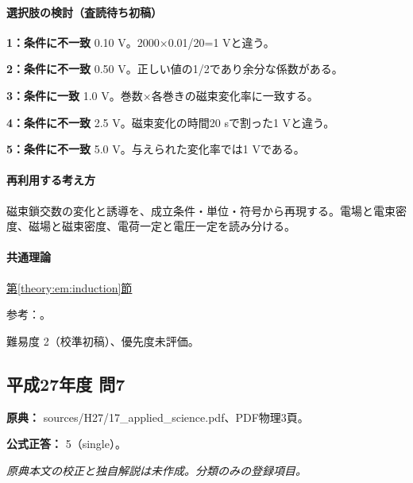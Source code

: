 \paragraph{選択肢の検討（査読待ち初稿）}\mbox{}\par

\noindent\textbf{1：条件に不一致} 0.10 V。2000×0.01/20=\allowbreak{}1 Vと違う。\par

\noindent\textbf{2：条件に不一致} 0.50 V。正しい値の1/2であり余分な係数がある。\par

\noindent\textbf{3：条件に一致} 1.0 V。巻数×各巻きの磁束変化率に一致する。\par

\noindent\textbf{4：条件に不一致} 2.5 V。磁束変化の時間20 sで割った1 Vと違う。\par

\noindent\textbf{5：条件に不一致} 5.0 V。与えられた変化率では1 Vである。\par

\paragraph{再利用する考え方} 磁束鎖交数の変化と誘導を、成立条件・単位・符号から再現する。電場と電束密度、磁場と磁束密度、電荷一定と電圧一定を読み分ける。

\paragraph{共通理論} \hyperref[theory:em:induction]{第\ref*{theory:em:induction}節}

\par 参考：\cite{mit_em10}。

\par 難易度 2（校準初稿）、優先度未評価。

\subsection{平成27年度 問7}
\label{q:h27-reg-applied-07}

\noindent\textbf{原典：} sources/H27/17\_applied\_science.pdf、PDF物理3頁。

\textbf{公式正答：} 5（single）。

\par\textit{原典本文の校正と独自解説は未作成。分類のみの登録項目。}

